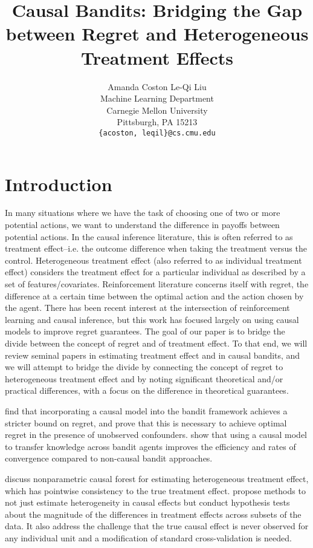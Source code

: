 \documentclass{article}
\title{Causal Bandits: Bridging the Gap between Regret and Heterogeneous Treatment Effects}
\author{
  Amanda Coston \quad Le-Qi Liu\\
  Machine Learning Department\\
  Carnegie Mellon University\\
  Pittsburgh, PA 15213 \\
  \texttt{\{acoston, leqil\}@cs.cmu.edu} \\
}
\begin{document}
\maketitle


\section{Introduction}
In many situations where we have the task of choosing one of two or more potential actions, we want to understand the difference in payoffs between potential actions. In the causal inference literature, this is often referred to as treatment effect--i.e. the outcome difference when taking the treatment versus the control. Heterogeneous treatment effect (also referred to as individual treatment effect) considers the treatment effect for a particular individual as described by a set of features/covariates.  Reinforcement literature concerns itself with regret, the difference at a certain time  between the optimal action and the action chosen by the agent. There has been recent interest at the intersection of reinforcement learning and causal inference, but this work has focused largely on using causal models to improve regret guarantees. The goal of our paper is to bridge the divide between the concept of regret and of  treatment effect.  To that end, we will review seminal papers in estimating treatment effect and in causal bandits, and we will attempt to bridge the divide by connecting the concept of regret to heterogeneous treatment effect and by noting significant theoretical and/or practical differences, with a focus on the difference in theoretical guarantees. 

\cite{lattimore2016causal} find that incorporating a causal model into the bandit framework achieves a stricter bound on regret, and \cite{bareinboim2015bandits} prove that this is necessary to achieve optimal regret in the presence of unobserved confounders. \cite{zhang2017transfer} show that using a causal model to transfer knowledge across bandit agents improves the efficiency and rates of convergence compared to non-causal bandit approaches.

\cite{wager2017estimation}  discuss nonparametric causal forest for estimating heterogeneous treatment effect, which has pointwise consistency to the true treatment effect. \cite{athey2016recursive} propose methods to not just estimate heterogeneity in causal effects but conduct hypothesis tests about the magnitude of the differences in treatment effects across subsets of the data. It also address the challenge that the true causal effect is never observed for any individual unit and a modification of standard cross-validation is needed.
\end{document}
